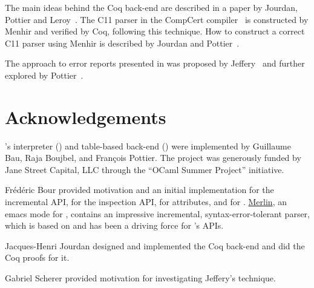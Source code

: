 \documentclass[onecolumn,11pt,nocopyrightspace,preprint]{sigplanconf}
\begin{document}
The main ideas behind the Coq back-end are described in a paper by Jourdan,
Pottier and Leroy~\cite{jourdan-leroy-pottier-12}. The C11 parser in the
CompCert compiler~\cite{compcert} is constructed by Menhir and verified by
Coq, following this technique. How to construct a correct C11 parser using
Menhir is described by Jourdan and Pottier~\cite{jourdan-pottier-17}.

The approach to error reports presented in  was
proposed by Jeffery~\cite{jeffery-03} and further explored by
Pottier~\cite{pottier-reachability-cc-2016}.


\section{Acknowledgements}

\menhir's interpreter (\ointerpret) and table-based back-end (\otable) were
implemented by Guillaume Bau, Raja Boujbel, and François Pottier. The project
was generously funded by Jane Street Capital, LLC through the ``OCaml Summer
Project'' initiative.

Frédéric Bour provided motivation and an initial implementation for the
incremental API, for the inspection API, for attributes, and for \menhirsdk.
\href{https://github.com/ocaml/merlin}{Merlin}, an emacs mode for \ocaml,
contains an impressive incremental, syntax-error-tolerant \ocaml parser,
which is based on \menhir and has been a driving force for \menhir's APIs.

Jacques-Henri Jourdan designed and implemented the Coq back-end and did the
Coq proofs for it.

Gabriel Scherer provided motivation for investigating Jeffery's technique.





\end{document}
